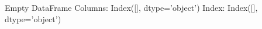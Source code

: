 \begin{tabular}{}
\toprule
Empty DataFrame
Columns: Index([], dtype='object')
Index: Index([], dtype='object') \\
\bottomrule
\end{tabular}

